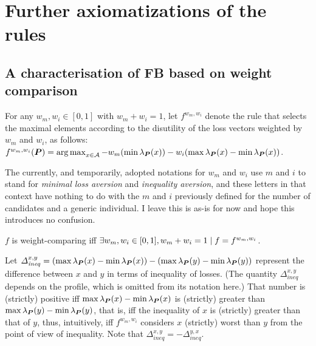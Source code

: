 \documentclass[version=3.21, pagesize, twoside=off, bibliography=totoc, DIV=calc, fontsize=12pt, a4paper]{scrartcl}
\begin{document}

\section{Further axiomatizations of the rules}
\subsection{A characterisation of FB based on weight comparison}
For any $w_m, w_i \in [0, 1]$ with $w_m + w_i = 1$, let $f^{w_m, w_i}$ denote the rule that selects the maximal elements according to the disutility of the loss vectors weighted by $w_m$ and $w_i$, as follows: $f^{w_m, w_i}(\prof) = \argmax_{x \in \allalts} -w_m(\min\lprof(x)) - w_i(\max \lprof(x) - \min \lprof(x))$. 

\begin{remark}
	The currently, and temporarily, adopted notations for $w_m$ and $w_i$ use $m$ and $i$ to stand for \emph{minimal loss aversion} and \emph{inequality aversion}, and these letters in that context have nothing to do with the $m$ and $i$ previously defined for the number of candidates and a generic individual. I leave this is as-is for now and hope this introduces no confusion.
\end{remark}

\begin{definition}
	$f$ is weight-comparing iff $\exists w_m, w_i \in [0, 1], w_m + w_i = 1 \suchthat f = f^{w_m, w_i}$.
\end{definition}

Let $\Delta^{x, y}_\mathit{ineq} = (\max \lprof(x) - \min \lprof(x)) - (\max \lprof(y) - \min \lprof(y))$ represent the difference between $x$ and $y$ in terms of inequality of losses. 
(The quantity $\Delta^{x, y}_\mathit{ineq}$ depends on the profile, which is omitted from its notation here.)
That number is (strictly) positive iff $\max \lprof(x) - \min \lprof(x)$ is (strictly) greater than $\max \lprof(y) - \min \lprof(y)$, that is, iff the inequality of $x$ is (strictly) greater than that of $y$, thus, intuitively, iff $f^{w_m, w_i}$ considers $x$ (strictly) worst than $y$ from the point of view of inequality.
Note that $\Delta^{x, y}_\mathit{ineq} = - \Delta^{y, x}_\mathit{ineq}$.
\end{document}

